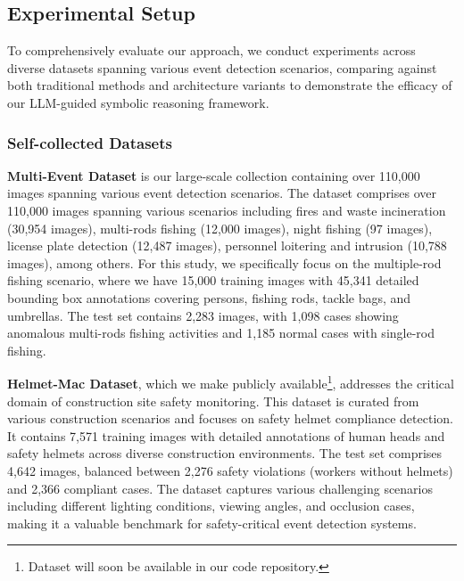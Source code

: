 \subsection{Experimental Setup}
To comprehensively evaluate our approach, we conduct experiments across diverse datasets spanning various event detection scenarios, comparing against both traditional methods and architecture variants to demonstrate the efficacy of our LLM-guided symbolic reasoning framework.
\subsubsection{Self-collected Datasets}
\noindent
\textbf{Multi-Event Dataset} is our large-scale collection containing over 110,000 images spanning various event detection scenarios. The dataset comprises over 110,000 images spanning various scenarios including fires and waste incineration (30,954 images), multi-rods fishing (12,000 images), night fishing (97 images), license plate detection (12,487 images), personnel loitering and intrusion (10,788 images), among others. For this study, we specifically focus on the multiple-rod fishing scenario, where we have 15,000 training images with 45,341 detailed bounding box annotations covering persons, fishing rods, tackle bags, and umbrellas. The test set contains 2,283 images, with 1,098 cases showing anomalous multi-rods fishing activities and 1,185 normal cases with single-rod fishing. \par
% 
\noindent
\textbf{Helmet-Mac Dataset}, which we make publicly available\footnote{Dataset will soon be available in our code repository.}, addresses the critical domain of construction site safety monitoring. This dataset is curated from various construction scenarios and focuses on safety helmet compliance detection. It contains 7,571 training images with detailed annotations of human heads and safety helmets across diverse construction environments. The test set comprises 4,642 images, balanced between 2,276 safety violations (workers without helmets) and 2,366 compliant cases. The dataset captures various challenging scenarios including different lighting conditions, viewing angles, and occlusion cases, making it a valuable benchmark for safety-critical event detection systems.
% 
